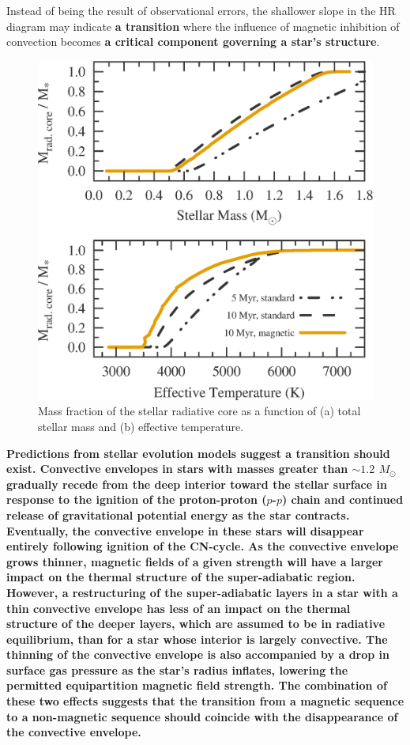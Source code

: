 \documentclass{aa}
\begin{document}
Instead of being the result of observational errors, the shallower slope in the HR diagram may indicate {\bf a transition} where the influence of magnetic inhibition of convection becomes {\bf a critical component governing a star's structure}.

\begin{figure}[t]
    \centering
    \includegraphics[width=0.95\linewidth]{radiative_core_masses.eps}
    \caption{Mass fraction of the stellar radiative core as a function of (a) total stellar mass and (b) effective temperature. }
    \label{fig:rad_core}
\end{figure}

{\bf Predictions from stellar evolution models suggest a transition should exist. Convective envelopes in stars with masses greater than $\sim1.2$ $M_{\odot}$ gradually recede from the deep interior toward the stellar surface in response to the ignition of the proton-proton ($p$-$p$) chain and continued release of gravitational potential energy as the star contracts. Eventually, the convective envelope in these stars will disappear entirely following ignition of the CN-cycle. As the convective envelope grows thinner, magnetic fields of a given strength will have a larger impact on the thermal structure of the super-adiabatic region. However, a restructuring of the super-adiabatic layers in a star with a thin convective envelope has less of an impact on the thermal structure of the deeper layers, which are assumed to be in radiative equilibrium, than for a star whose interior is largely convective. The thinning of the convective envelope is also accompanied by a drop in surface gas pressure as the star's radius inflates, lowering the permitted equipartition magnetic field strength. The combination of these two effects suggests that the transition from a magnetic sequence to a non-magnetic sequence should coincide with the disappearance of the convective envelope.} %
\end{document}

